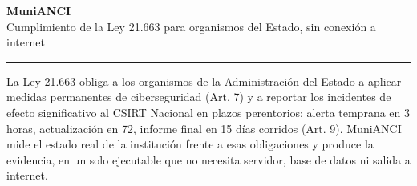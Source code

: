\documentclass[10pt,a4paper]{article}
\newcommand{\barra}{\textcolor{azul}{\rule{\linewidth}{1.2pt}}}
\begin{document}
{\color{azul}\Huge\bfseries MuniANCI}\\[2pt]
{\color{gris}\large Cumplimiento de la Ley 21.663 para organismos del Estado, sin conexión a
internet}

\vspace{4pt}
\barra

\vspace{6pt}

La Ley 21.663 obliga a los organismos de la Administración del Estado a aplicar medidas
permanentes de ciberseguridad (Art. 7\textdegree) y a reportar los incidentes de efecto
significativo al CSIRT Nacional en plazos perentorios: alerta temprana en 3 horas,
actualización en 72, informe final en 15 días corridos (Art. 9\textdegree). MuniANCI mide
el estado real de la institución frente a esas obligaciones y produce la evidencia, en un
solo ejecutable que no necesita servidor, base de datos ni salida a internet.
\end{document}
